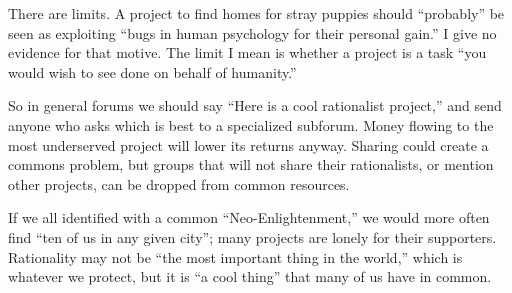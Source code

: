 There are limits. A project to find homes for stray puppies should ``probably'' be seen as exploiting ``bugs in human psychology for their personal gain.'' I give no evidence for that motive. The limit I mean is whether a project is a task ``you would wish to see done on behalf of humanity.''

So in general forums we should say ``Here is a cool rationalist project,'' and send anyone who asks which is best to a specialized subforum. Money flowing to the most underserved project will lower its returns anyway. Sharing could create a commons problem, but groups that will not share their rationalists, or mention other projects, can be dropped from common resources.

If we all identified with a common ``Neo-Enlightenment,'' we would more often find ``ten of us in any given city''; many projects are lonely for their supporters. Rationality may not be ``the most important thing in the world,'' which is whatever we protect, but it is ``a cool thing'' that many of us have in common.
